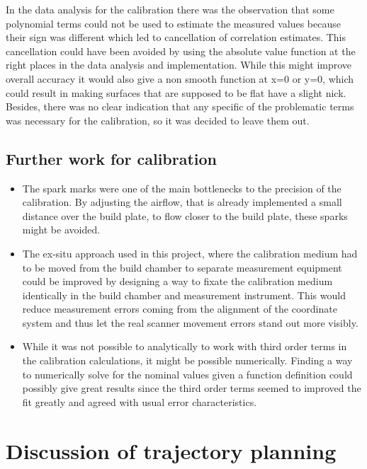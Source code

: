 In the data analysis for the calibration there was the observation that some polynomial terms could not be used to estimate the measured values because their sign was different which led to cancellation of correlation estimates. This cancellation could have been avoided by using the absolute value function at the right places in the data analysis and implementation. While this might improve overall accuracy it would also give a non smooth function at x=0 or y=0, which could result in making surfaces that are supposed to be flat have a slight nick. Besides, there was no clear indication that any specific of the problematic terms was necessary for the calibration, so it was decided to leave them out.

\subsection{Further work for calibration}

\begin{itemize}
    \item The spark marks were one of the main bottlenecks to the precision of the calibration. By adjusting the airflow, that is already implemented a small distance over the build plate, to flow closer to the build plate, these sparks might be avoided.
    \item The ex-situ approach used in this project, where the calibration medium had to be moved from the build chamber to separate measurement equipment could be improved by designing a way to fixate the calibration medium identically in the build chamber and measurement instrument. This would reduce measurement errors coming from the alignment of the coordinate system and thus let the real scanner movement errors stand out more visibly.
    \item While it was not possible to analytically to work with third order terms in the calibration calculations, it might be possible numerically. Finding a way to numerically solve for the nominal values given a function definition could possibly give great results since the third order terms seemed to improved the fit greatly and agreed with usual error characteristics.
\end{itemize}

\section{Discussion of trajectory planning} \label{sec:trajectory-discussion}

